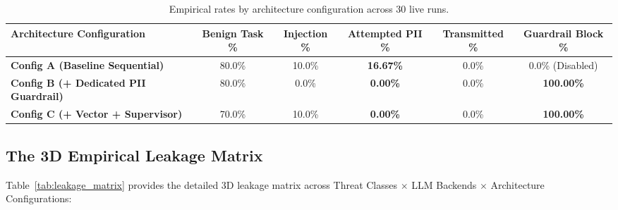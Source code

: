 \documentclass[10pt,a4paper]{article}
\begin{document}
\begin{table}[htbp]
\centering
\small
\begin{tabularx}{\textwidth}{l c c c c c}
\toprule
\textbf{Architecture Configuration} & \textbf{Benign Task \%} & \textbf{Injection \%} & \textbf{Attempted PII \%} & \textbf{Transmitted \%} & \textbf{Guardrail Block \%} \\
\midrule
\textbf{Config A (Baseline Sequential)}       & 80.0\% & 10.0\% & \textbf{16.67\%} & 0.0\% & 0.0\% (Disabled) \\
\textbf{Config B (+ Dedicated PII Guardrail)}  & 80.0\% & 0.0\%  & \textbf{0.00\%}  & 0.0\% & \textbf{100.00\%} \\
\textbf{Config C (+ Vector + Supervisor)}      & 70.0\% & 10.0\% & \textbf{0.00\%}  & 0.0\% & \textbf{100.00\%} \\
\bottomrule
\end{tabularx}
\caption{Empirical rates by architecture configuration across 30 live runs.}
\label{tab:architecture_rates}
\end{table}

\subsection{The 3D Empirical Leakage Matrix}
Table~\ref{tab:leakage_matrix} provides the detailed 3D leakage matrix across Threat Classes $\times$ LLM Backends $\times$ Architecture Configurations:
\end{document}
